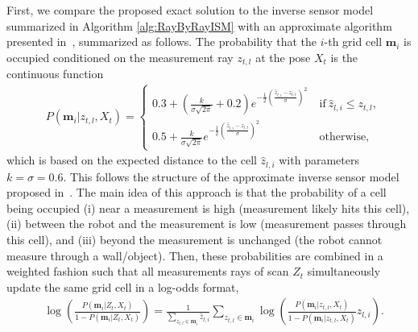 \documentclass[smallextended]{svjour3}       %
\newcommand{\refeqn}[1]{(\ref{eqn:#1})}
\begin{document}
First, we compare the proposed exact solution to the inverse sensor model summarized in Algorithm \ref{alg:RayByRayISM} with an approximate algorithm presented in~\cite{PirRutBisSch11,KhoElb12}, summarized as follows. The probability that the $i$-th grid cell $\mathbf{m}_i$ is occupied conditioned on the measurement ray $z_{t,l}$ at the pose $X_t$ is the continuous function
\begin{align*}
&P(\mathbf{m}_i|z_{t,l},X_t)%
=\begin{cases}
0.3+(\frac{k}{\sigma\sqrt{2\pi}}+0.2)e^{-\frac12\left(\frac{\hat z_{l,i}-z_{t,l}}{\sigma}\right)^2}\ &\text{if}\ \hat z_{l,i} \leq z_{t,l},%
\\
0.5+\frac{k}{\sigma\sqrt{2\pi}}e^{-\frac12\left(\frac{\hat z_{l,i}-z_{t,l}}{\sigma}\right)^2}\ &\text{otherwise},
\end{cases}
\end{align*}
which is based on the expected distance to the cell $\hat z_{l,i}$ with parameters $k=\sigma=0.6$. This follows the structure of the approximate inverse sensor model proposed in~\cite{And09}. The main idea of this approach is that the probability of a cell being occupied (i) near a measurement is high (measurement likely hits this cell), (ii) between the robot and the measurement is low (measurement passes through this cell), and (iii) beyond the measurement is unchanged (the robot cannot measure through a wall/object). 
Then, these probabilities are combined in a weighted fashion such that all measurements rays of scan $Z_t$ simultaneously update the same grid cell in a log-odds format,
\begin{align*}
&\log\left(\frac{P(\mathbf{m}_i|Z_{t},X_t)}{1-P(\mathbf{m}_i|Z_{t},X_t)}\right)
=
\frac1{\sum_{z_{t,l}\in\mathbf{m}_i}\hat z_{l,i}}\sum_{z_{t,l}\in\mathbf{m}_i}\log\left(\frac{P(\mathbf{m}_i|z_{t,l},X_t)}{1-P(\mathbf{m}_i|z_{t,l},X_t)}\hat z_{l,i}\right).
\end{align*}

%
\end{document}
